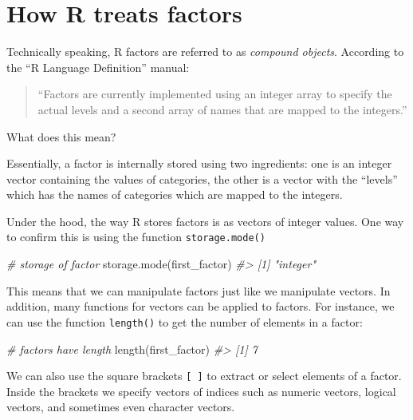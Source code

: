\documentclass[
]{book}
\newenvironment{Shaded}{\begin{snugshade}}{\end{snugshade}}
\newcommand{\CommentTok}[1]{\textcolor[rgb]{0.56,0.35,0.01}{\textit{#1}}}
\newcommand{\FunctionTok}[1]{\textcolor[rgb]{0.00,0.00,0.00}{#1}}
\newcommand{\NormalTok}[1]{#1}
\begin{document}
\hypertarget{how-r-treats-factors}{%
\section{How R treats factors}\label{how-r-treats-factors}}

Technically speaking, R factors are referred to as \emph{compound objects}. According
to the ``R Language Definition'' manual:

\begin{quote}
``Factors are currently implemented using an integer array to specify the
actual levels and a second array of names that are mapped to the integers.''
\end{quote}

What does this mean?

Essentially, a factor is internally stored using two ingredients: one is an
integer vector containing the values of categories, the other is a vector with
the ``levels'' which has the names of categories which are mapped to the integers.

Under the hood, the way R stores factors is as vectors of integer values.
One way to confirm this is using the function \texttt{storage.mode()}

\begin{Shaded}
\begin{Highlighting}[]
\CommentTok{\# storage of factor}
\FunctionTok{storage.mode}\NormalTok{(first\_factor)}
\CommentTok{\#\textgreater{} [1] "integer"}
\end{Highlighting}
\end{Shaded}

This means that we can manipulate factors just like we manipulate vectors. In
addition, many functions for vectors can be applied to factors. For instance,
we can use the function \texttt{length()} to get the number of elements in a factor:

\begin{Shaded}
\begin{Highlighting}[]
\CommentTok{\# factors have length}
\FunctionTok{length}\NormalTok{(first\_factor)}
\CommentTok{\#\textgreater{} [1] 7}
\end{Highlighting}
\end{Shaded}

We can also use the square brackets \texttt{{[}\ {]}} to extract or select elements of a
factor. Inside the brackets we specify vectors of indices such as numeric
vectors, logical vectors, and sometimes even character vectors.
\end{document}
